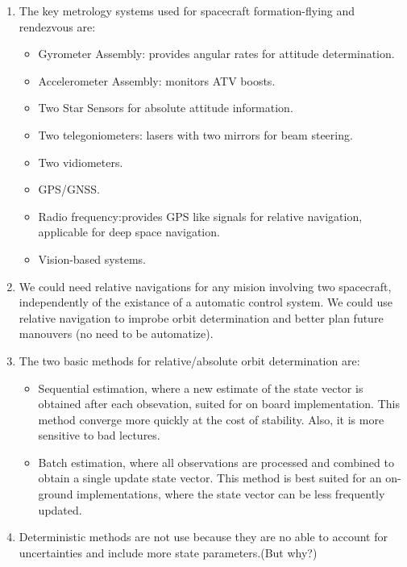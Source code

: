 \documentclass[a4paper]{article}
\begin{document}
\begin{enumerate}
  \item The key metrology systems used for spacecraft formation-flying and rendezvous are:
    \begin{itemize}
      \item Gyrometer Assembly: provides angular rates for attitude determination.
      \item Accelerometer Assembly: monitors ATV boosts.
      \item Two Star Sensors for absolute attitude information.
      \item Two telegoniometers: lasers with two mirrors for beam steering.
      \item Two vidiometers.
      \item GPS/GNSS.
      \item Radio frequency:provides GPS like signals for relative navigation, applicable for deep space navigation.
      \item Vision-based systems.
    \end{itemize}

  \item We could need relative navigations for any mision involving two spacecraft, independently of the existance of a automatic control system. We could use relative navigation to improbe orbit determination and better plan future manouvers (no need to be automatize).

  \item The two basic methods for relative/absolute orbit determination are:
    \begin{itemize}
      \item Sequential estimation, where a new estimate of the state vector is obtained after each obsevation, suited for on board implementation. This method converge more quickly at the cost of stability. Also, it is more sensitive to bad lectures.
      \item Batch estimation, where all observations are processed and combined to obtain a single update state vector. This method is best suited for an on-ground implementations, where the state vector can be less frequently updated.
    \end{itemize}
  
  \item Deterministic methods are not use because they are no able to account for uncertainties and include more state parameters.(But why?)


\end{enumerate}
\end{document}
